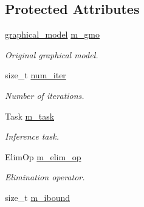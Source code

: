 \subsection*{Protected Attributes}
\begin{DoxyCompactItemize}
\item 
\hyperlink{classmerlin_1_1graphical__model}{graphical\+\_\+model} \hyperlink{classmerlin_1_1ijgp_a94a5a3960cccee65a302db50d3157390}{m\+\_\+gmo}\hypertarget{classmerlin_1_1ijgp_a94a5a3960cccee65a302db50d3157390}{}\label{classmerlin_1_1ijgp_a94a5a3960cccee65a302db50d3157390}

\begin{DoxyCompactList}\small\item\em Original graphical model. \end{DoxyCompactList}\item 
size\+\_\+t \hyperlink{classmerlin_1_1ijgp_a277f1da495f57da65fad7903dba33e88}{num\+\_\+iter}\hypertarget{classmerlin_1_1ijgp_a277f1da495f57da65fad7903dba33e88}{}\label{classmerlin_1_1ijgp_a277f1da495f57da65fad7903dba33e88}

\begin{DoxyCompactList}\small\item\em Number of iterations. \end{DoxyCompactList}\item 
Task \hyperlink{classmerlin_1_1ijgp_a95e03dea51e4dc87d7a48a50415df005}{m\+\_\+task}\hypertarget{classmerlin_1_1ijgp_a95e03dea51e4dc87d7a48a50415df005}{}\label{classmerlin_1_1ijgp_a95e03dea51e4dc87d7a48a50415df005}

\begin{DoxyCompactList}\small\item\em Inference task. \end{DoxyCompactList}\item 
Elim\+Op \hyperlink{classmerlin_1_1ijgp_a4a80b800e11190f3eb790cfd9899dad7}{m\+\_\+elim\+\_\+op}\hypertarget{classmerlin_1_1ijgp_a4a80b800e11190f3eb790cfd9899dad7}{}\label{classmerlin_1_1ijgp_a4a80b800e11190f3eb790cfd9899dad7}

\begin{DoxyCompactList}\small\item\em Elimination operator. \end{DoxyCompactList}\item 
size\+\_\+t \hyperlink{classmerlin_1_1ijgp_aa15a0be92dea2367ba5686b3f9aebebe}{m\+\_\+ibound}\hypertarget{classmerlin_1_1ijgp_aa15a0be92dea2367ba5686b3f9aebebe}{}\label{classmerlin_1_1ijgp_aa15a0be92dea2367ba5686b3f9aebebe}


\end{DoxyCompactItemize}

